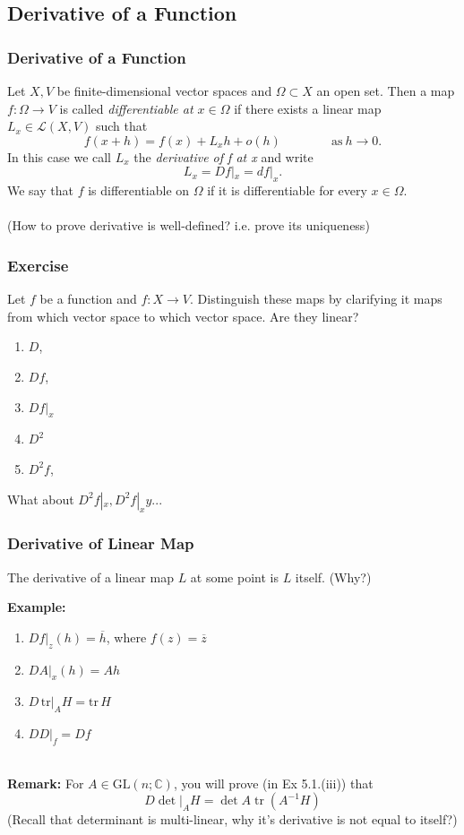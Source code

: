 \documentclass[12pt, t]{beamer}
\renewcommand{\emph}[1]{{\color{Turquoise3}\textsl{#1}}}
\newcommand{\C}{\mathbb{C}} \newcommand{\F}{\mathbb{F}} \newcommand{\R}{\mathbb{R}} \newcommand{\Q}{\mathbb{Q}}
\newcommand{\nullspace}{~\\[15pt]}
\begin{document}
\subsection{Derivative of a Function}
\begin{frame}
    \frametitle{Derivative of a Function}
    Let $X,V$ be finite-dimensional vector spaces and $\Omega\subset X$ an open set. Then a map $f:\Omega\to V$ is called \emph{differentiable at $x\in\Omega$} if there exists a linear map $L_x\in\mathcal{L}(X,V)$ such that
    \setcounter{equation}{0}
    \begin{equation}\label{2.2.1}
        f(x+h)=f(x)+L_xh+o(h)\qquad\qquad\text{as}~h\to 0.
    \end{equation}
    In this case we call $L_x$ the \emph{derivative of f at x} and write
    \[L_x=Df|_x=df|_x.\]
    We say that $f$ is differentiable on $\Omega$ if it is differentiable for every $x\in\Omega$.\\[5pt]
    \nullspace
    (How to prove derivative is well-defined? i.e. prove its uniqueness)
\end{frame}

\begin{frame}
    \frametitle{Exercise}
    Let $f$ be a function and $f:X\to V$. Distinguish these maps by clarifying it maps from which vector space to which vector space. Are they linear?
    \begin{spacing}{2}
        \begin{enumerate}
            \item $D$,
            \item $Df$,
            \item $Df|_x$
            \item $D^2$
            \item $D^2f$,
        \end{enumerate}
    \end{spacing}
    What about $D^2f|_x,D^2f|_xy...$
\end{frame}

\begin{frame}
    \frametitle{Derivative of Linear Map}
    The derivative of a linear map $L$ at some point is $L$ itself. (Why?)

    \textbf{Example:}
    \begin{enumerate}
        \item $Df|_z(h)=\overline{h}$, where $f(z)=\overline{z}$
        \item $DA|_x(h)=Ah$
        \item $D\,\text{tr}|_AH=\text{tr}\,H$
        \item $DD|_f=Df$
    \end{enumerate}

    \nullspace
    \textbf{Remark:}
    For $A\in \text{GL}(n;\C)$, you will prove (in Ex 5.1.(iii)) that
    $$\left.D \operatorname{det}\right|_{A} H=\operatorname{det} A \operatorname{tr}\left(A^{-1} H\right)$$
    (Recall that determinant is multi-linear, why it's derivative is not equal to itself?)
\end{frame}
\end{document}
